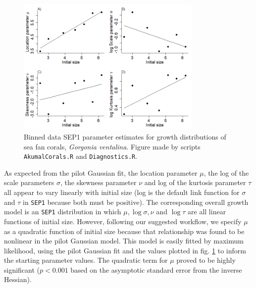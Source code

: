 \documentclass[11pt]{article}
\begin{document}
{\begin{figure}[tbp]
\centering
\includegraphics[width=0.8\textwidth]{figures/RollingSEP1parsCorals.png}
\caption{Binned data SEP1 parameter estimates for growth distributions of sea fan corals, \emph{Gorgonia ventalina}. 
Figure made by scripts \texttt{AkumalCorals.R} and \texttt{Diagnostics.R}.}
\label{fig:AkumalRollingSEP1pars}
\end{figure} 

As expected from the pilot Gaussian fit, the location parameter $\mu$, the log of the scale parameters $\sigma$, the 
skewness parameter $\nu$ and log of the kurtosis parameter $\tau$ all appear to vary linearly with initial size 
(log is the default link function for $\sigma$ and $\tau$ in \texttt{SEP1} because both must be positive).
The corresponding overall growth model is an \texttt{SEP1} distribution in 
which $\mu, \log \sigma, \nu$ and $\log \tau$ are all linear functions of initial size.
However, following our suggested workflow, we specify $\mu$ as a quadratic function of initial size because that relationship
was found to be nonlinear in the pilot Gaussian model. This model is easily fitted by maximum likelihood, 
using the pilot Gaussian fit and the values plotted in fig. \ref{fig:AkumalRollingSEP1pars} to 
inform the starting parameter values. The quadratic term for $\mu$ proved to be highly significant
($p<0.001$ based on the asymptotic standard error from the inverse Hessian). 

}
\end{document}
